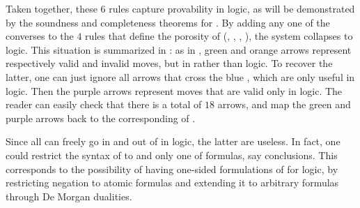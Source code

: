 \begin{description}
  Taken together, these $6$ rules capture provability in
  \emph{} logic, as will be demonstrated by the soundness
  and completeness theorems for . By adding any one of the
  converses to the $4$ rules that define the porosity of 
   (, , ,
  ), the system collapses to \emph{} logic. This
  situation is summarized in : as in
  , green and orange arrows represent respectively valid
  and invalid moves, but in  rather than
   logic. To recover the latter, one can just ignore all
  arrows that cross the blue , which are only useful in
   logic. Then the purple arrows represent moves that
  are valid only in  logic. The reader can easily check that there
  is a total of $18$ arrows, and map the green and purple arrows back to the
  corresponding  of .

  \begin{remark}
    Since all   can freely go in and out of
      in  logic, the latter are useless.
    In fact, one could restrict the syntax of  to 
     and only one  of formulas, say conclusions. This
    corresponds to the possibility of having one-sided formulations of
     for  logic, by restricting negation to
    atomic formulas and extending it to arbitrary formulas through De Morgan
    dualities.
  \end{remark}
  

\end{description}
